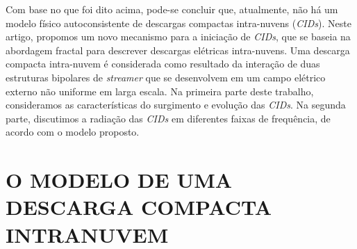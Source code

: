 \documentclass[a4paper, 12pt, onecolumn,singlespacing]{article}
\begin{document}
	Com base no que foi dito acima, pode-se concluir que, atualmente, não há um modelo físico autoconsistente de descargas compactas intra-nuvens (\textit{CIDs}). Neste artigo, propomos um novo mecanismo para a iniciação de \textit{CIDs}, que se baseia na abordagem fractal para descrever descargas elétricas intra-nuvens. Uma descarga compacta intra-nuvem é considerada como resultado da interação de duas estruturas bipolares de \textit{streamer} que se desenvolvem em um campo elétrico externo não uniforme em larga escala. Na primeira parte deste trabalho, consideramos as características do surgimento e evolução das \textit{CIDs}. Na segunda parte, discutimos a radiação das \textit{CIDs} em diferentes faixas de frequência, de acordo com o modelo proposto.
	
	\section{O MODELO DE UMA DESCARGA COMPACTA INTRANUVEM}
	
\end{document}
